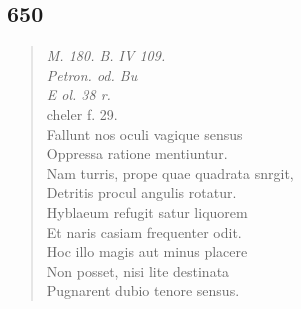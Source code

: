 \documentclass[11pt, a4paper]{report}
\begin{document}
            \subsection*{650}
      \begin{verse}
      \textit{M. 180. B. IV 109.} \\ \textit{Petron. od. Bu} \\ \textit{E ol. 38 r.} \\ cheler f. 29. \\ Fallunt nos oculi vagique sensus \\ Oppressa ratione mentiuntur. \\ Nam turris, prope quae quadrata snrgit, \\ Detritis procul angulis rotatur. \\ Hyblaeum refugit satur liquorem \\ Et naris casiam frequenter odit. \\ Hoc illo magis aut minus placere \\ Non posset, nisi lite destinata \\ Pugnarent dubio tenore sensus. \\ 
      \end{verse}
  
\end{document}
